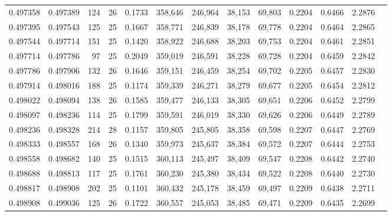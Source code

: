 \begin{tabular}{rrrrrrrrrrrrr}
0.497358 & 0.497389 &   124 &  26 &                                     0.1733 & 358,646 & 246,964 &  38,153 &  69,803 & 0.2204 & 0.6466 & 2.2876 \\
0.497395 & 0.497543 &   125 &  25 &                                     0.1667 & 358,771 & 246,839 &  38,178 &  69,778 & 0.2204 & 0.6464 & 2.2865 \\
0.497544 & 0.497714 &   151 &  25 &                                     0.1420 & 358,922 & 246,688 &  38,203 &  69,753 & 0.2204 & 0.6461 & 2.2851 \\
0.497714 & 0.497786 &    97 &  25 &                                     0.2049 & 359,019 & 246,591 &  38,228 &  69,728 & 0.2204 & 0.6459 & 2.2842 \\
0.497786 & 0.497906 &   132 &  26 &                                     0.1646 & 359,151 & 246,459 &  38,254 &  69,702 & 0.2205 & 0.6457 & 2.2830 \\
0.497914 & 0.498016 &   188 &  25 &                                     0.1174 & 359,339 & 246,271 &  38,279 &  69,677 & 0.2205 & 0.6454 & 2.2812 \\
0.498022 & 0.498094 &   138 &  26 &                                     0.1585 & 359,477 & 246,133 &  38,305 &  69,651 & 0.2206 & 0.6452 & 2.2799 \\
0.498097 & 0.498236 &   114 &  25 &                                     0.1799 & 359,591 & 246,019 &  38,330 &  69,626 & 0.2206 & 0.6449 & 2.2789 \\
0.498236 & 0.498328 &   214 &  28 &                                     0.1157 & 359,805 & 245,805 &  38,358 &  69,598 & 0.2207 & 0.6447 & 2.2769 \\
0.498333 & 0.498557 &   168 &  26 &                                     0.1340 & 359,973 & 245,637 &  38,384 &  69,572 & 0.2207 & 0.6444 & 2.2753 \\
0.498558 & 0.498682 &   140 &  25 &                                     0.1515 & 360,113 & 245,497 &  38,409 &  69,547 & 0.2208 & 0.6442 & 2.2740 \\
0.498688 & 0.498813 &   117 &  25 &                                     0.1761 & 360,230 & 245,380 &  38,434 &  69,522 & 0.2208 & 0.6440 & 2.2730 \\
0.498817 & 0.498908 &   202 &  25 &                                     0.1101 & 360,432 & 245,178 &  38,459 &  69,497 & 0.2209 & 0.6438 & 2.2711 \\
0.498908 & 0.499036 &   125 &  26 &                                     0.1722 & 360,557 & 245,053 &  38,485 &  69,471 & 0.2209 & 0.6435 & 2.2699 \\

\end{tabular}
